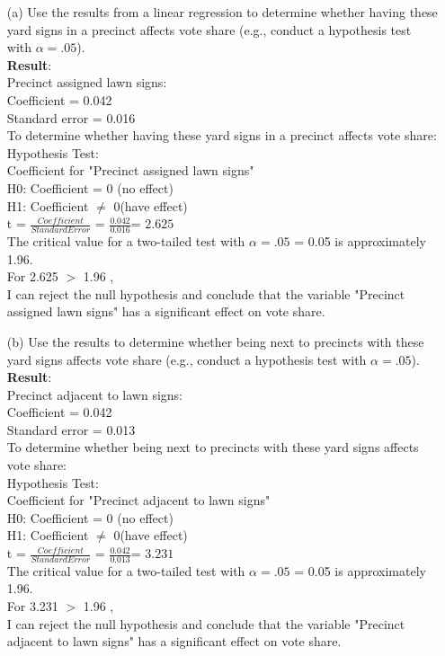 \documentclass[12pt,letterpaper]{article}
\begin{document}
\vspace{.5cm}
\begin{enumerate}
	\item [(a)] Use the results from a linear regression to determine whether having these yard signs in a precinct affects vote share (e.g., conduct a hypothesis test with $\alpha = .05$).
	\vspace{.25cm}\\
	\textbf{Result}:\\
	Precinct assigned lawn signs:\\
	Coefficient = 0.042\\
	Standard error = 0.016\\
	To determine whether having these yard signs in a precinct affects vote share:\\
	Hypothesis Test:\\
	Coefficient for "Precinct assigned lawn signs"\\
	H0: Coefficient  = 0 (no effect)\\
	H1: Coefficient  $\neq$ 0(have effect)\\
	t = $\frac{Coefficient}{Standard Error}$ = $\frac{0.042}{0.016}$= ${2.625}$ \\
	The critical value for a two-tailed test with  $\alpha = .05$ = 0.05 is approximately 1.96.\\
	For 2.625 $>$ 1.96 ,\\
	I can reject the null hypothesis and conclude that the variable "Precinct assigned lawn signs" has a significant effect on vote share.\\
	
			
	\item [(b)]  Use the results to determine whether being
	next to precincts with these yard signs affects vote
	share (e.g., conduct a hypothesis test with $\alpha = .05$).
	\vspace{.25cm}\\
	\textbf{Result}:\\
	Precinct adjacent to lawn signs:\\
	Coefficient = 0.042\\
	Standard error = 0.013\\
	To determine whether being next to precincts with these yard signs affects vote share:\\
	Hypothesis Test:\\
	Coefficient for "Precinct adjacent to lawn signs"\\
	H0: Coefficient  = 0 (no effect)\\
	H1: Coefficient  $\neq$ 0(have effect)\\
	t = $\frac{Coefficient}{Standard Error}$ = $\frac{0.042}{0.013}$= ${3.231}$ \\
	The critical value for a two-tailed test with  $\alpha = .05$ = 0.05 is approximately 1.96.\\
	For 3.231 $>$ 1.96 ,\\
	I can reject the null hypothesis and conclude that the variable "Precinct adjacent to lawn signs" has a significant effect on vote share.\\
	

\end{enumerate}
\end{document}
